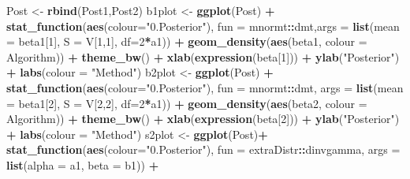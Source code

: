 \documentclass[
]{book}
\newenvironment{Shaded}{\begin{snugshade}}{\end{snugshade}}
\newcommand{\DataTypeTok}[1]{\textcolor[rgb]{0.13,0.29,0.53}{#1}}
\newcommand{\DecValTok}[1]{\textcolor[rgb]{0.00,0.00,0.81}{#1}}
\newcommand{\KeywordTok}[1]{\textcolor[rgb]{0.13,0.29,0.53}{\textbf{#1}}}
\newcommand{\NormalTok}[1]{#1}
\newcommand{\OperatorTok}[1]{\textcolor[rgb]{0.81,0.36,0.00}{\textbf{#1}}}
\newcommand{\StringTok}[1]{\textcolor[rgb]{0.31,0.60,0.02}{#1}}
\begin{document}
\begin{Shaded}
\begin{Highlighting}[]
\NormalTok{Post <-}\StringTok{ }\KeywordTok{rbind}\NormalTok{(Post1,Post2)}
\NormalTok{b1plot <-}\StringTok{ }\KeywordTok{ggplot}\NormalTok{(Post) }\OperatorTok{+}
\StringTok{  }\KeywordTok{stat_function}\NormalTok{(}\KeywordTok{aes}\NormalTok{(}\DataTypeTok{colour=}\StringTok{"0.Posterior"}\NormalTok{), }\DataTypeTok{fun =}\NormalTok{ mnormt}\OperatorTok{::}\NormalTok{dmt,}\DataTypeTok{args =} \KeywordTok{list}\NormalTok{(}\DataTypeTok{mean =}\NormalTok{ beta1[}\DecValTok{1}\NormalTok{], }\DataTypeTok{S =}\NormalTok{ V[}\DecValTok{1}\NormalTok{,}\DecValTok{1}\NormalTok{], }\DataTypeTok{df=}\DecValTok{2}\OperatorTok{*}\NormalTok{a1)) }\OperatorTok{+}
\StringTok{  }\KeywordTok{geom_density}\NormalTok{(}\KeywordTok{aes}\NormalTok{(beta1, }\DataTypeTok{colour =}\NormalTok{ Algorithm)) }\OperatorTok{+}\StringTok{ }\KeywordTok{theme_bw}\NormalTok{() }\OperatorTok{+}
\StringTok{  }\KeywordTok{xlab}\NormalTok{(}\KeywordTok{expression}\NormalTok{(beta[}\DecValTok{1}\NormalTok{])) }\OperatorTok{+}\StringTok{ }\KeywordTok{ylab}\NormalTok{(}\StringTok{"Posterior"}\NormalTok{) }\OperatorTok{+}\StringTok{ }\KeywordTok{labs}\NormalTok{(}\DataTypeTok{colour =} \StringTok{"Method"}\NormalTok{)}
\NormalTok{b2plot <-}\StringTok{ }\KeywordTok{ggplot}\NormalTok{(Post) }\OperatorTok{+}
\StringTok{  }\KeywordTok{stat_function}\NormalTok{(}\KeywordTok{aes}\NormalTok{(}\DataTypeTok{colour=}\StringTok{"0.Posterior"}\NormalTok{), }\DataTypeTok{fun =}\NormalTok{ mnormt}\OperatorTok{::}\NormalTok{dmt, }\DataTypeTok{args =} \KeywordTok{list}\NormalTok{(}\DataTypeTok{mean =}\NormalTok{ beta1[}\DecValTok{2}\NormalTok{], }\DataTypeTok{S =}\NormalTok{ V[}\DecValTok{2}\NormalTok{,}\DecValTok{2}\NormalTok{], }\DataTypeTok{df=}\DecValTok{2}\OperatorTok{*}\NormalTok{a1)) }\OperatorTok{+}
\StringTok{  }\KeywordTok{geom_density}\NormalTok{(}\KeywordTok{aes}\NormalTok{(beta2, }\DataTypeTok{colour =}\NormalTok{ Algorithm)) }\OperatorTok{+}\StringTok{ }\KeywordTok{theme_bw}\NormalTok{() }\OperatorTok{+}
\StringTok{  }\KeywordTok{xlab}\NormalTok{(}\KeywordTok{expression}\NormalTok{(beta[}\DecValTok{2}\NormalTok{])) }\OperatorTok{+}\StringTok{ }\KeywordTok{ylab}\NormalTok{(}\StringTok{"Posterior"}\NormalTok{) }\OperatorTok{+}\StringTok{ }\KeywordTok{labs}\NormalTok{(}\DataTypeTok{colour =} \StringTok{"Method"}\NormalTok{)}
\NormalTok{s2plot <-}\StringTok{ }\KeywordTok{ggplot}\NormalTok{(Post)}\OperatorTok{+}
\StringTok{  }\KeywordTok{stat_function}\NormalTok{(}\KeywordTok{aes}\NormalTok{(}\DataTypeTok{colour=}\StringTok{"0.Posterior"}\NormalTok{), }\DataTypeTok{fun =}\NormalTok{ extraDistr}\OperatorTok{::}\NormalTok{dinvgamma, }\DataTypeTok{args =} \KeywordTok{list}\NormalTok{(}\DataTypeTok{alpha =}\NormalTok{ a1, }\DataTypeTok{beta =}\NormalTok{ b1)) }\OperatorTok{+}

\end{Highlighting}
\end{Shaded}
\end{document}
